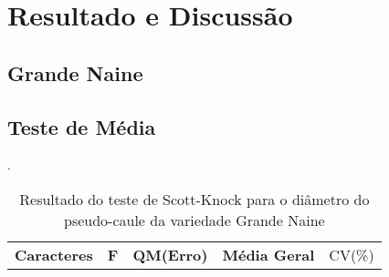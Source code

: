 \chapter{Resultado e Discussão}
\section{Grande Naine}

\section{Teste de Média}
  
 
\begin{table}[!htb]
 	\begin{center}
 		\caption{Resultado do teste de Scott-Knock para o diâmetro do pseudo-caule da variedade Grande Naine}.
	 	\begin{tabular}{ccccc}
 		\toprule
 		\toprule
 		\textbf{Caracteres} & \textbf{F}  & \textbf{QM(Erro)} & \textbf{Média Geral} & CV(\%) \\

 		\end{tabular}\\
 	\end{center}
\end{table}